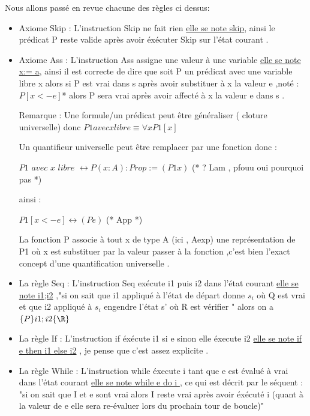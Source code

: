\documentclass{article}
\begin{document}
Nous allons passé en revue chacune des règles ci dessus:

\begin{itemize}
    \item Axiome Skip :
        L'instruction Skip ne fait rien \underline{elle se note skip}, ainsi le prédicat P reste valide après avoir éxécuter Skip sur l'état courant .
    \item Axiome Ass :
        L'instruction Ass assigne une valeur à une variable \underline{elle se note x:= a}, ainsi il est correcte de dire que soit P un prédicat avec une variable libre x alors si P est vrai dans s après avoir substituer à x la valeur e ,noté : $P[x<- e ]$*  alors P sera vrai après avoir affecté à x la valeur e dans s .
        
        Remarque : Une formule/un prédicat peut être généraliser ( cloture universelle) donc 
        $P1 avec x libre \equiv \forall x P1[x]$ 
        
        Un quantifieur universelle peut être remplacer par une fonction  donc :
        
        $P1 \textit{ avec x libre } \leftrightarrow P (x:A) : Prop := (P1 x) $ (* ? Lam , pfouu oui pourquoi pas   *)
        
        ainsi :
        
        $P1[x<- e ] \leftrightarrow  (P e)  $ (* App *)
        
        La fonction P associe à tout x de type A (ici , Aexp) une représentation de P1 où x est substituer par la valeur passer à la fonction ,c'est  bien l'exact concept d'une quantification universelle .
        
      \item La règle Seq :
      L'instruction Seq exécute i1 puis i2 dans l'état courant \underline{elle se note i1;i2} ,"si on sait que i1 appliqué à l'état de départ donne $s_i$ où Q est vrai et que i2 appliqué à $s_i$ engendre l'état s' où R est vérifier " alors on a $\{P\}i1;i2\{\R\}$  
      
      \item La règle If :
      L'instruction if éxécute i1 si e sinon elle éxecute i2 \underline{elle se note if e then i1 else i2} , je pense que c'est assez explicite .
      
      \item La règle While :
      L'instruction while éxecute i tant que e est évalué à vrai dans l'état courant  \underline{elle se note while e do i } , ce qui est décrit par le séquent : "si on sait que I et e sont vrai alors I reste vrai après avoir éxécuté i (quant à la valeur de e elle sera re-évaluer lors du prochain tour de boucle)" 
      

\end{itemize}
\end{document}
